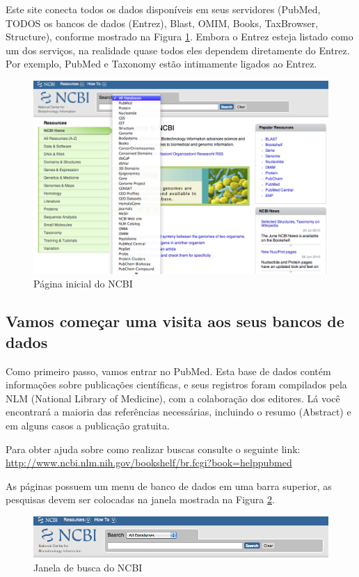 \documentclass[letter,11pt]{book}
\begin{document}
Este site conecta todos os dados disponíveis em seus servidores (PubMed, TODOS os bancos de dados (Entrez), Blast, OMIM, Books, TaxBrowser, Structure), conforme mostrado na Figura \ref{screenshotNCBI}. Embora o Entrez esteja listado como um dos serviços, na realidade quase todos eles dependem diretamente do Entrez. Por exemplo, PubMed e Taxonomy estão intimamente ligados ao Entrez. 

\begin{figure}[ht]
\centering
   \includegraphics[width=15cm]{Figs/NCBIStart.png}
  \caption{\label{screenshotNCBI}Página inicial do NCBI}
\end{figure}

\subsection{Vamos começar uma visita aos seus bancos de dados}

Como primeiro passo, vamos entrar no PubMed. Esta base de dados contém informações sobre publicações científicas, e seus registros foram compilados pela NLM (National Library of Medicine), com a colaboração dos editores. Lá você encontrará a maioria das referências necessárias, incluindo o resumo (Abstract) e em alguns casos a publicação gratuita. 

Para obter ajuda sobre como realizar buscas consulte o seguinte link:  \url{http://www.ncbi.nlm.nih.gov/bookshelf/br.fcgi?book=helppubmed}

As páginas possuem um menu de banco de dados em uma barra superior, as pesquisas devem ser colocadas na janela mostrada na Figura \ref{screenshotsearchbox}.

\begin{figure}[ht]
\centering
   \includegraphics[width=15cm]{Figs/NCBISearchBox.png}
  \caption{\label{screenshotsearchbox}Janela de busca do NCBI }
\end{figure}
 
\end{document}

